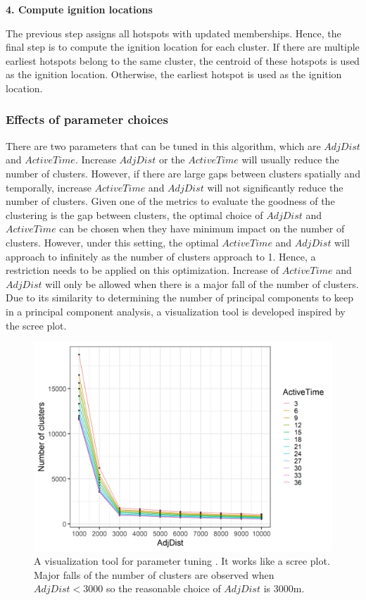 \textbf{4. Compute ignition locations}

The previous step assigns all hotspots with updated memberships. Hence,
the final step is to compute the ignition location for each cluster. If
there are multiple earliest hotspots belong to the same cluster, the
centroid of these hotspots is used as the ignition location. Otherwise,
the earliest hotspot is used as the ignition location.

\hypertarget{effects-of-parameter-choices}{%
\subsubsection{Effects of parameter
choices}\label{effects-of-parameter-choices}}

There are two parameters that can be tuned in this algorithm, which are
\(AdjDist\) and \(ActiveTime\). Increase \(AdjDist\) or the
\(ActiveTime\) will usually reduce the number of clusters. However, if
there are large gaps between clusters spatially and temporally, increase
\(ActiveTime\) and \(AdjDist\) will not significantly reduce the number
of clusters. Given one of the metrics to evaluate the goodness of the
clustering is the gap between clusters, the optimal choice of
\(AdjDist\) and \(ActiveTime\) can be chosen when they have minimum
impact on the number of clusters. However, under this setting, the
optimal \(ActiveTime\) and \(AdjDist\) will approach to infinitely as
the number of clusters approach to 1. Hence, a restriction needs to be
applied on this optimization. Increase of \(ActiveTime\) and \(AdjDist\)
will only be allowed when there is a major fall of the number of
clusters. Due to its similarity to determining the number of principal
components to keep in a principal component analysis, a visualization
tool is developed inspired by the scree plot.

\begin{Schunk}
\begin{figure}

{\centering \includegraphics[width=0.8\linewidth]{figures/clustering_tuning_1} 

}

\caption[A visualization tool for parameter tuning ]{A visualization tool for parameter tuning . It works like a scree plot. Major falls of the number of clusters are observed when $AdjDist < 3000$ so the reasonable choice of $AdjDist$ is 3000m.}\label{fig:vis1}
\end{figure}
\end{Schunk}

